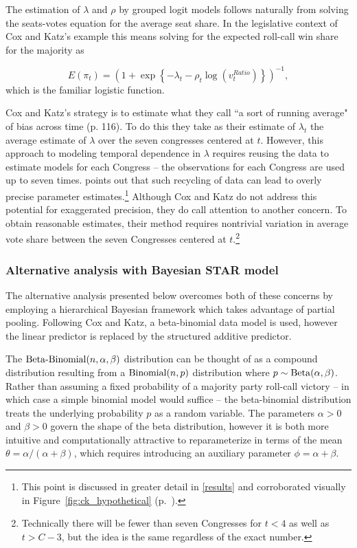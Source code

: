 The estimation of $\lambda$ and $\rho$ by grouped logit models follows naturally from 
solving the seats-votes equation for the average seat share. In the legislative context of 
Cox and Katz's example this means solving for the expected roll-call win share for the 
majority as

\begin{equation*}
  E(\pi_t)  = \left(1 + \exp{\left\{- \lambda_t - \rho_t \log{\left( v_t^{Ratio}  \right)}\right\}}\right)^{-1},
\end{equation*}
%
\noindent which is the familiar logistic function. 

Cox and Katz's strategy is to estimate what they call ``a sort of running average" of bias 
across time (p. 116). To do this they take as their estimate of $\lambda_t$ the average 
estimate of $\lambda$ over the seven congresses centered at $t$. However, this 
approach to modeling temporal dependence in $\lambda$ requires reusing the data 
to estimate models for each Congress -- the observations for each Congress are used 
up to seven times.   points out that such recycling of 
data can lead to overly precise parameter estimates.\footnote{This point is discussed in 
greater detail in \ref{results} and corroborated visually in 
Figure~\ref{fig:ck_hypothetical} (p.~\pageref{fig:ck_hypothetical}).} 
Although Cox and Katz do not address this potential for exaggerated precision, they do 
call attention to another  concern. To obtain reasonable estimates, their method requires 
nontrivial variation in average vote share between the seven Congresses centered at 
$t$.\footnote{Technically there will be fewer than seven Congresses for $t < 4$ as well as 
$t > C- 3$, but the idea is the same regardless of the exact number.}

\subsubsection{Alternative analysis with Bayesian STAR model}
\label{reanalysis}

The alternative analysis presented below overcomes both of these concerns by employing 
a hierarchical Bayesian framework which takes advantage of partial pooling. Following Cox 
and Katz, a beta-binomial data model is used, however the linear predictor is replaced by the 
structured additive predictor. 

The ${\rm Beta\text{-}Binomial}(n,\alpha,\beta)$ distribution can be thought of as a compound 
distribution resulting from a ${\rm Binomial}(n,p)$ distribution where $p \sim {\rm Beta}(\alpha,\beta)$. 
Rather than assuming a fixed probability of a majority party roll-call victory -- in which case a simple 
binomial model would suffice -- the beta-binomial distribution treats the underlying probability $p$ 
as a random variable. The parameters $\alpha > 0$ and $\beta > 0$ govern the shape of the beta 
distribution, however it is both more intuitive and computationally attractive to reparameterize in terms 
of the mean $\theta = \alpha / (\alpha + \beta)$, which requires introducing an auxiliary parameter 
$\phi = \alpha + \beta$. 

